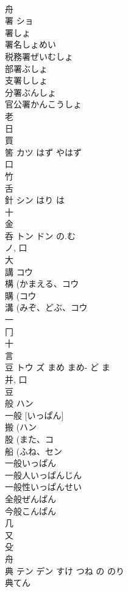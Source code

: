 \documentclass[8pt]{extreport}
\begin{document}
\begin{CJK}{UTF8}{min}
\\	舟 
\\	署	ショ		
\\	署しょ
\\	署名しょめい
\\	税務署ぜいむしょ
\\	部署ぶしょ
\\	支署ししょ
\\	分署ぶんしょ
\\	官公署かんこうしょ
\\	老 
\\	日 
\\	買 
\\	筈	カツ	はず やはず	
\\	口 
\\	竹 
\\	舌 
\\	針	シン	はり は	
\\	十 
\\	金 
\\	呑	トン ドン	の.む	
\\	ノ, 口 
\\	大 
\\	講	コウ		
\\	構 (かまえる、コウ 
\\	購 (コウ 
\\	溝 (みぞ、どぶ、コウ 
\\	一 
\\	冂 
\\	十 
\\	言 
\\	豆	トウ ズ	まめ まめ- ど ま	
\\	并, 口 
\\	豆 
\\	般	ハン		
\\	一般 [いっぱん] 
\\	搬 (ハン 
\\	股 (また、コ 
\\	船 (ふね、セン 
\\	一般いっぱん
\\	一般人いっぱんじん
\\	一般性いっぱんせい
\\	全般ぜんぱん
\\	今般こんぱん
\\	几 
\\	又 
\\	殳 
\\	舟 
\\	典	テン デン	すけ つね の のり	
\\	典てん

\end{CJK}
\end{document}
